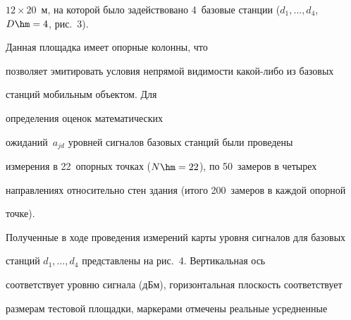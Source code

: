$12\times20$~м, на которой было задействовано 4~базовые станции ($d_1, \ldots

, d_4$, $D\hm=4$, рис.~3).

 Данная площадка имеет опорные колонны, что

позволяет эмитировать условия непрямой видимости какой-либо из базовых

станций мобильным объектом. Для\linebreak

\vspace*{-12pt}






\noindent

определения оценок математических

ожиданий~$a_{jd}$ уровней сигналов базовых станций были проведены

измерения в 22~опорных точках ($N\hm=22$), по 50~замеров в четырех

направлениях относительно стен здания (итого 200~замеров в каждой опорной

точке).



Полученные в ходе проведения измерений карты уровня сигналов для базовых

станций $d_1,\ldots , d_4$ пред\-став\-ле\-ны на рис.~4. Вертикальная ось

соответствует уровню сигнала (дБм), горизонтальная плоскость соответствует

размерам тестовой площадки, маркерами отмечены реальные усредненные

